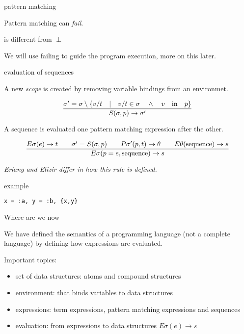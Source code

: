 \begin{frame}{pattern matching}

\pause Pattern matching can {\em fail}. 

\pause\vspace{20pt}{\em fail} is different from $\perp$

We will use failing to guide the program execution, more on this later.

\end{frame}

\begin{frame}{evaluation of sequences}

  \pause  A new {\em scope} is created by removing variable bindings from an environmet.

  \vspace{10pt}\pause

$$\frac{\sigma' = \sigma \setminus \lbrace v/t \quad | \quad v/t \in \sigma \quad \wedge \quad  v \quad {\rm in} \quad p\rbrace}{S(\sigma, p) \rightarrow \sigma'}$$
  
\vspace{10pt}\pause

A sequence is evaluated one pattern matching expression after the other. 

$$\frac{   
  E\sigma(e) \rightarrow t
  \qquad \sigma' = S(\sigma, p)
  \qquad P\sigma'(p, t) \rightarrow \theta
  \qquad E\theta({\rm sequence}) \rightarrow s
}{E\sigma(p = e, {\rm sequence}) \rightarrow s}$$ 

\vfill
{\em Erlang and Elixir differ in how this rule is defined.}
\end{frame}

\begin{frame}{example}

   {\tt x = :a, y = :b, \{x,y\}}

\end{frame}



\begin{frame}{Where are we now}

We have defined the semantics of a programming language (not a
complete language) by defining how expressions are evaluated.

\vspace{20pt} 

\pause Important topics:

\vspace{10pt} 

\begin{itemize}
 \pause \item set of data structures: atoms and compound structures
 \pause \item environment: that binds variables to data structures
 \pause \item expressions: term expressions, pattern matching expressions and sequences
 \pause \item evaluation: from expressions to data structures $E\sigma(e) \rightarrow s$
\end{itemize}

\end{frame}

